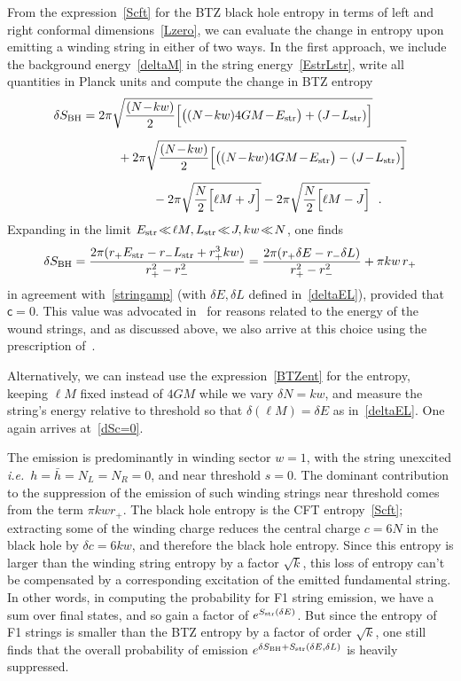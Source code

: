 \documentclass[11pt]{article}
\newcommand{\rcite}{\cite}
\def\str{{\rm str}}
\def\BH{{\rm BH}}
\def\tight#1{\! #1 \!}  %
\def\[{\left[}
\def\ie{{i.e.}}
\def\sfc{{\mathsf c}}
\def\be{\begin{equation}}
\def\ee{\end{equation}}
\numberwithin{equation}{section}
\def\ie{{\it i.e.}}
\def\ie{{\it i.e.}}
\begin{document}
From the expression~\eqref{Scft} for the BTZ black hole entropy in terms of left and right conformal dimensions~\eqref{Lzero}, we can evaluate the change in entropy upon emitting a winding string in either of two ways.  In the first approach, we include the background energy~\eqref{deltaM} in the string energy~\eqref{EstrLstr}, write all quantities in Planck units and compute the change in BTZ entropy
\begin{align}
\begin{split}
\label{dSbtz}
\delta S_\BH &= 
2\pi \sqrt{\frac{(N\tight-kw)}{2}\Big[ \big((N\tight-kw)4G M\tight-E_\str\big) + (J\tight-L_\str)\Big] } 
\\[.2cm]
&\hskip 1cm
+ 2\pi \sqrt{\frac{(N\tight-kw)}{2}\Big[ \big((N\tight-kw)4G M\tight-E_\str\big) - (J\tight-L_\str)\Big] }
\\[.2cm]
&\hskip 2cm 
-2\pi \sqrt{\frac{N}{2}\Big[ \ell M + J\Big] } - 2\pi \sqrt{\frac{N}{2}\Big[ \ell M-J\Big] } ~~.
\end{split}
\end{align}
Expanding in the limit $E_\str \tight\ll \ell M, L_\str \tight\ll J, kw \tight\ll N$, one finds
\be
\label{dSc=0}
\delta S_\BH =  \frac{ 2\pi(r_+ E_\str-  r_- L_\str+ r_+^3 kw)}{r_+^2-r_-^2} 
=  \frac{ 2\pi(r_+ \delta E-  r_- \delta L)}{r_+^2-r_-^2} + \pi kw \,r_+
\ee
in agreement with~\eqref{stringamp} (with $\delta E,\delta L$ defined in~\eqref{deltaEL}), provided that $\sfc=0$.
This value was advocated in~\rcite{Ashok:2021ffx} for reasons related to the energy of the wound strings, and as discussed above, we also arrive at this choice using the prescription of~\rcite{Ferrari:2016vcl}.

Alternatively, we can instead use the expression~\eqref{BTZent} for the entropy, keeping $\ell M$ fixed instead of $4G M$ while we vary $\delta N=kw$, and measure the string's energy relative to threshold so that $\delta(\ell M)=\delta E$ as in~\eqref{deltaEL}.  One again arrives at~\eqref{dSc=0}.


The emission is predominantly in winding sector $w=1$, with the string unexcited \ie\ $h=\bar h=N_L= N_R=0$, and near threshold $s=0$.  The dominant contribution to the suppression of the emission of such winding strings near threshold comes from the term $\pi kw r_+$.  The black hole entropy is the CFT entropy~\eqref{Scft}; extracting some of the winding charge reduces the central charge $c=6N$ in the black hole by $\delta c=6kw$, and therefore the black hole entropy.  Since this entropy is larger than the winding string entropy by a factor $\sqrt{k}$, this loss of entropy can't be compensated by a corresponding excitation of the emitted fundamental string.  In other words, in computing the probability for F1 string emission, we have a sum over final states, and so gain a factor of $e^{S_\str(\delta E)}$.  But since the entropy of F1 strings is smaller than the BTZ entropy by a factor of order $\sqrt{k}$, one still finds that the overall probability of emission $e^{\delta S_\BH+S_\str(\delta E,\delta L)}$ is heavily suppressed.
\end{document}
